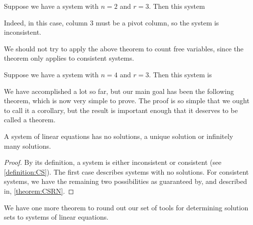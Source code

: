 \documentclass{ximera}
\begin{document}
\begin{example}
  Suppose we have a system with $n=2$ and $r=3$.  Then this system
  \begin{multipleChoice}
  \end{multipleChoice}
  \begin{feedback}
    Indeed, in this case, column 3 must be a pivot column, so the
    system is inconsistent.

    We should not try to apply the above theorem to count free
    variables, since the theorem only applies to consistent
    systems.
  \end{feedback}
\end{example}

\begin{example}
  Suppose we have a system with $n=4$ and $r=3$.  Then this system is
  \begin{multipleChoice}
  \end{multipleChoice}
\end{example}

We have accomplished a lot so far, but our main goal has been the
following theorem, which is now very simple to prove.  The proof is so
simple that we ought to call it a corollary, but the result is
important enough that it deserves to be called a theorem.

\begin{theorem}
\label{theorem:PSSLS}

A system of linear equations has no solutions, a unique solution or infinitely many solutions.

\begin{proof}
By its definition, a system is either inconsistent or consistent (see \ref{definition:CS}).  The first case describes systems with no solutions.  For consistent systems, we have the remaining two possibilities as guaranteed by, and described in, \ref{theorem:CSRN}.
\end{proof}
\end{theorem}

We have one more theorem to round out our set of tools for determining solution sets to systems of linear equations.
\end{document}
